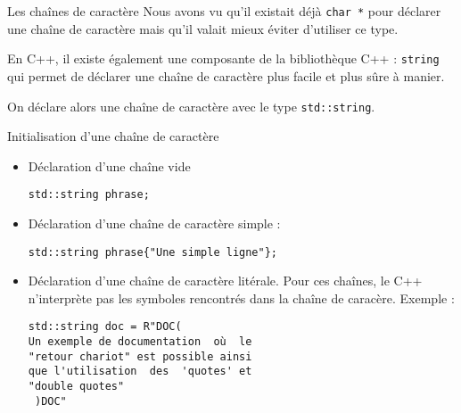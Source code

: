 \documentclass[compress,10pt,aspectratio=169]{beamer}
\begin{document}
\begin{frame}[fragile]{Les chaînes de caractère}
    \scriptsize
    Nous avons vu qu'il existait déjà \texttt{char *} pour déclarer une chaîne de caractère mais qu'il valait mieux éviter d'utiliser ce type.

    En C++, il existe également une composante de la bibliothèque C++ : \texttt{string} qui permet de déclarer une chaîne de caractère plus facile et plus sûre à manier.

    On déclare alors une chaîne de caractère avec le type \texttt{std::string}.

    \begin{block}{\small Initialisation d'une chaîne de caractère}
    \begin{multicols}{2}
\begin{itemize}
\item Déclaration d'une chaîne vide
\begin{verbatim}
std::string phrase;
\end{verbatim}
\item Déclaration d'une chaîne de caractère simple : 
\begin{verbatim}
std::string phrase{"Une simple ligne"};
\end{verbatim}
\columnbreak
\item Déclaration d'une chaîne de caractère litérale. Pour ces chaînes, le C++ n'interprète pas les symboles rencontrés dans la chaîne de caracère. Exemple :
\begin{verbatim}
std::string doc = R"DOC(
Un exemple de documentation  où  le
"retour chariot" est possible ainsi 
que l'utilisation  des  'quotes' et 
"double quotes"
 )DOC"
\end{verbatim}
    \end{itemize}
    \end{multicols}
    \end{block}
\end{frame}
\end{document}
